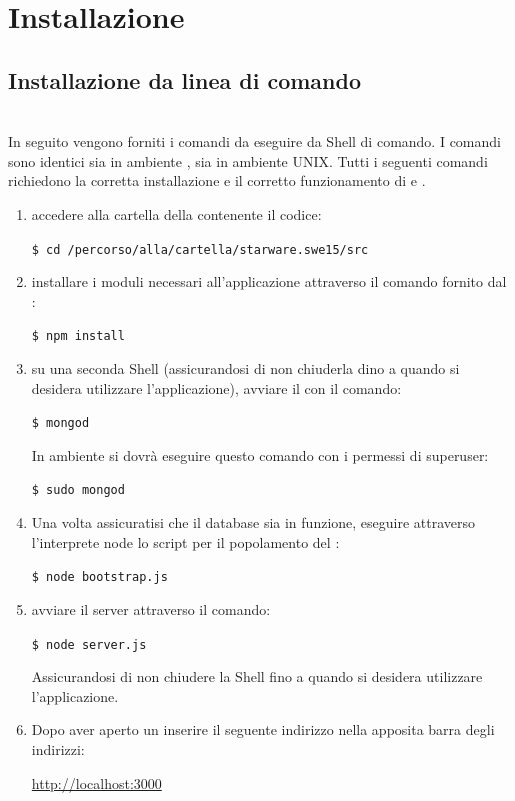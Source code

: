 \documentclass[12pt,a4paper]{article}
\begin{document}
	\newpage
	\section{Installazione}\label{install}
	\subsection{Installazione da linea di comando}
	\\
	In seguito vengono forniti i comandi da eseguire da Shell di comando. I comandi sono identici sia in ambiente , sia in ambiente UNIX.
	Tutti i seguenti comandi richiedono la corretta installazione e il corretto funzionamento di  e .
	\begin{enumerate}
		\item accedere alla cartella della  contenente il codice:
		\begin{center}
			\texttt{\$ cd /percorso/alla/cartella/starware.swe15/src} 
		\end{center}
		\item installare i moduli  necessari all'applicazione attraverso il comando fornito dal :
		\begin{center}
			\texttt{\$ npm install} 
		\end{center}
		\item su una seconda Shell (assicurandosi di non chiuderla dino a quando si desidera utilizzare l'applicazione), avviare il   con il comando:
		\begin{center}
			\texttt{\$ mongod} 	
		\end{center}	
		In ambiente  si dovrà eseguire questo comando con i permessi di superuser:
		\begin{center}
			\texttt{\$ sudo mongod} 	
		\end{center}
		\item Una volta assicuratisi che il database sia in funzione, eseguire attraverso l'interprete node lo script per il popolamento del :
		\begin{center}
			\texttt{\$ node bootstrap.js} 	
		\end{center} 
		\item avviare il server  attraverso il comando:
		\begin{center}
			\texttt{\$ node server.js} 	
		\end{center} 
		Assicurandosi di non chiudere la Shell fino a quando si desidera utilizzare l'applicazione.
		\item Dopo aver aperto un  inserire il seguente indirizzo nella apposita barra degli indirizzi:
		\begin{center}
			\url{http://localhost:3000}
		\end{center}
			
	\end{enumerate}
		
\end{document}
